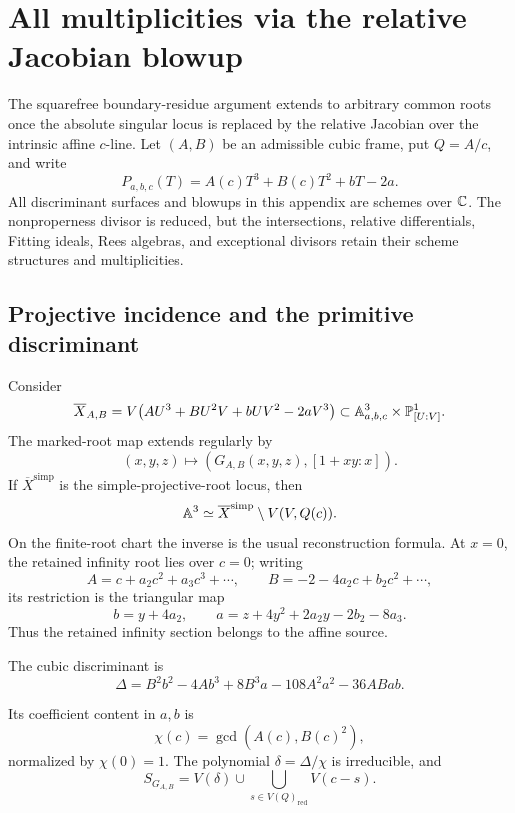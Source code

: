 \section{All multiplicities via the relative Jacobian blowup}
\label{app:all-multiplicity-relative-jacobian}

The squarefree boundary-residue argument extends to arbitrary common roots
once the absolute singular locus is replaced by the relative Jacobian over
the intrinsic affine \(c\)-line.  Let \((A,B)\) be an admissible cubic frame,
put \(Q=A/c\), and write
\[
P_{a,b,c}(T)=A(c)T^3+B(c)T^2+bT-2a.
\]
All discriminant surfaces and blowups in this appendix are schemes over
\(\mathbb C\).  The nonproperness divisor is reduced, but the intersections,
relative differentials, Fitting ideals, Rees algebras, and exceptional
divisors retain their scheme structures and multiplicities.

\subsection{Projective incidence and the primitive discriminant}

Consider
\[
\overline X_{A,B}
=V\!\left(AU^3+BU^2V+bUV^2-2aV^3\right)
\subset\mathbb A^3_{a,b,c}\times\mathbb P^1_{[U:V]}.
\]
The marked-root map extends regularly by
\[
(x,y,z)\longmapsto
\left(G_{A,B}(x,y,z),[1+xy:x]\right).
\]
If \(\overline X^{\mathrm{simp}}\) is the simple-projective-root locus, then
\begin{equation}
\label{eq:projective-source-identification}
\mathbb A^3
\simeq
\overline X^{\mathrm{simp}}\setminus V(V,Q(c)).
\end{equation}
On the finite-root chart the inverse is the usual reconstruction formula.
At \(x=0\), the retained infinity root lies over \(c=0\); writing
\[
A=c+a_2c^2+a_3c^3+\cdots,\qquad
B=-2-4a_2c+b_2c^2+\cdots,
\]
its restriction is the triangular map
\[
b=y+4a_2,\qquad
a=z+4y^2+2a_2y-2b_2-8a_3.
\]
Thus the retained infinity section belongs to the affine source.

The cubic discriminant is
\[
\Delta=B^2b^2-4Ab^3+8B^3a-108A^2a^2-36ABab.
\]

\begin{proposition}
\label{prop:primitive-discriminant-content}
Its coefficient content in \(a,b\) is
\[
\chi(c)=\gcd(A(c),B(c)^2),
\]
normalized by \(\chi(0)=1\).  The polynomial
\(\delta=\Delta/\chi\) is irreducible, and
\[
S_{G_{A,B}}
=V(\delta)\cup
\bigcup_{s\in V(Q)_{\mathrm{red}}}V(c-s).
\]
\end{proposition}


